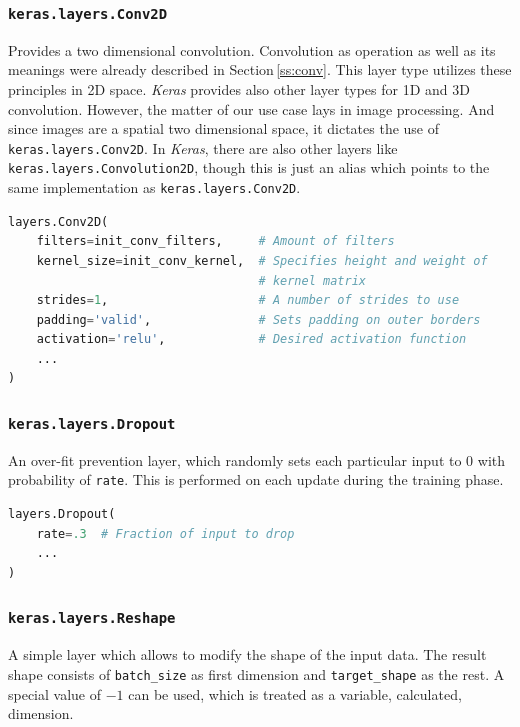 \subsubsection{\texttt{keras.layers.Conv2D}}

Provides a two dimensional convolution. Convolution as operation as well as its meanings were already described in Section\,\ref{ss:conv}. This layer type utilizes these principles in 2D space. \textit{Keras} provides also other layer types for 1D and 3D convolution. However, the matter of our use case lays in image processing. And since images are a spatial two dimensional space, it dictates the use of \texttt{keras.layers.Conv2D}. In \textit{Keras}, there are also other layers like \texttt{keras.layers.Convolution2D}, though this is just an alias which points to the same implementation as \texttt{keras.layers.Conv2D}.

\begin{lstlisting}[language=Python, caption=2D convolution layer]
layers.Conv2D(
    filters=init_conv_filters,     # Amount of filters
    kernel_size=init_conv_kernel,  # Specifies height and weight of
                                   # kernel matrix
    strides=1,                     # A number of strides to use
    padding='valid',               # Sets padding on outer borders
    activation='relu',             # Desired activation function
    ...
)
\end{lstlisting}

\subsubsection{\texttt{keras.layers.Dropout}}

An over-fit prevention layer, which randomly sets each particular input to 0 with probability of \texttt{rate}. This is performed on each update during the training phase.


\begin{lstlisting}[language=Python, caption=Dropout layer]
layers.Dropout(
    rate=.3  # Fraction of input to drop
    ...
)
\end{lstlisting}

\subsubsection{\texttt{keras.layers.Reshape}}

A simple layer which allows to modify the shape of the input data. The result shape consists of \texttt{batch\_size} as first dimension and \texttt{target\_shape} as the rest. A special value of $-1$ can be used, which is treated as a variable, calculated, dimension.

